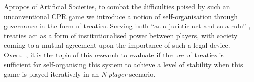 Apropos of Artificial Societies, to combat the difficulties poised by such an unconventional CPR game we introduce a notion of self-organisation through governance in the form of treaties. Serving both ``as a juristic act and as a rule'' \cite{reuter1995introduction}, treaties act as a form of institutionalised power between players, with society coming to a mutual agreement upon the importance of such a legal device. Overall, it is the topic of this research to evaluate if the use of treaties is sufficient for self-organising this system to achieve a level of stability when this game is played iteratively in an \textit{N-player} scenario.